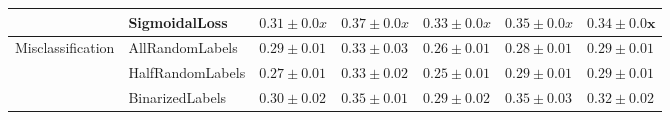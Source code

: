 \begin{table}[t]
{\begin{tabular}{l|l|llll|l}
                                                                                      & SigmoidalLoss                                                       & \multicolumn{1}{l}{$0.31\pm0.0x$}                                                                       & \multicolumn{1}{l}{$0.37\pm0.0x$}                                                           & \multicolumn{1}{l}{$0.33\pm0.0x$}                                                                              & \multicolumn{1}{l|}{$0.35\pm0.0x$}                                                                      & $\mathbf{0.34\pm0.0x}$                                                                                                 \\ \hline
\multirow{3}{*}{Misclassification}                                                    & AllRandomLabels                                                     & $0.29\pm0.01$                                                                                           & $0.33\pm0.03$                                                                               & $0.26\pm0.01$                                                                                                  & $0.28\pm0.01$                                                                                           & $0.29\pm0.01$                                                                                                          \\
                                                                                      & HalfRandomLabels                                                    & $0.27\pm0.01$                                                                                           & $0.33\pm0.02$                                                                               & $0.25\pm0.01$                                                                                                  & $0.29\pm0.01$                                                                                           & $0.29\pm0.01$                                                                                                          \\
                                                                                      & BinarizedLabels                                                     & $0.30\pm0.02$                                                                                           & $0.35\pm0.01$                                                                               & $0.29\pm0.02$                                                                                                  & $0.35\pm0.03$                                                                                           & $\mathbf{0.32\pm0.02}$                                                                                                 \\ \hline

\end{tabular}}
\end{table}
